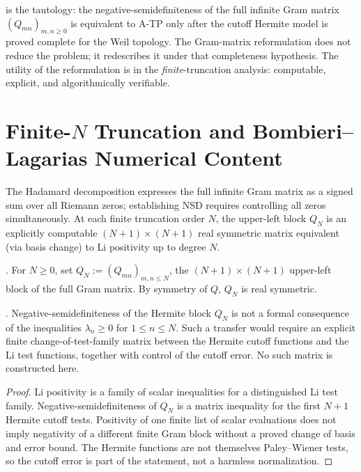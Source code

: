 \begin{remark}
\label{v4-arith:w7-h:rem:tautology}
 is the tautology: the
negative-semidefiniteness of the full infinite Gram matrix
\((Q_{mn})_{m,n\geq 0}\) is equivalent to A-TP only after the cutoff
Hermite model is proved complete for the Weil topology. The
Gram-matrix reformulation does not reduce the problem; it
redescribes it under that completeness hypothesis. The utility of the reformulation is in the
\emph{finite}-truncation analysis: computable, explicit, and
algorithmically verifiable.
\end{remark}

\section{Finite-\(N\) Truncation and Bombieri--Lagarias Numerical Content}
\label{v4-arith:w7-h:finite-N}

The Hadamard decomposition expresses the full infinite Gram matrix
as a signed sum over all Riemann zeros; establishing NSD requires
controlling all zeros simultaneously. At each finite truncation
order \(N\), the upper-left block \(Q_N\) is an explicitly computable
\((N+1)\times(N+1)\) real symmetric matrix equivalent (via basis
change) to Li positivity up to degree \(N\).

\begin{definition}
\label{v4-arith:w7-h:def:truncated}
\ClaimStatusDefinitional. For \(N\geq 0\), set
\(Q_{N}:=(Q_{mn})_{m,n\leq N}\), the \((N+1)\times(N+1)\) upper-left
block of the full Gram matrix. By symmetry of \(Q\), \(Q_{N}\) is real
symmetric.
\end{definition}

\begin{theorem}
\label{v4-arith:w7-h:thm:finite-N-li}
\ClaimStatusProvedHere. Negative-semidefiniteness of the Hermite block
\(Q_{N}\) is not a formal consequence of the inequalities
\(\lambda_{n}\geq0\) for \(1\leq n\leq N\). Such a transfer would require
an explicit finite change-of-test-family matrix between the
Hermite cutoff functions and the Li test functions, together with
control of the cutoff error. No such matrix is constructed here.
\end{theorem}

\begin{proof}
Li positivity is a family of scalar inequalities for a distinguished
Li test family. Negative-semidefiniteness of \(Q_{N}\) is a matrix
inequality for the first \(N+1\) Hermite cutoff tests. Positivity of
one finite list of scalar evaluations does not imply negativity of a
different finite Gram block without a proved change of basis and error
bound. The Hermite functions are not themselves Paley--Wiener tests,
so the cutoff error is part of the statement, not a harmless
normalization.
\end{proof}

